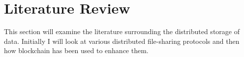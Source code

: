 
\chapter{Literature Review}\label{ch:lit-review}

This section will examine the literature surrounding the distributed storage of data. Initially I will look at various distributed file-sharing protocols and then how blockchain has been used to enhance them.





